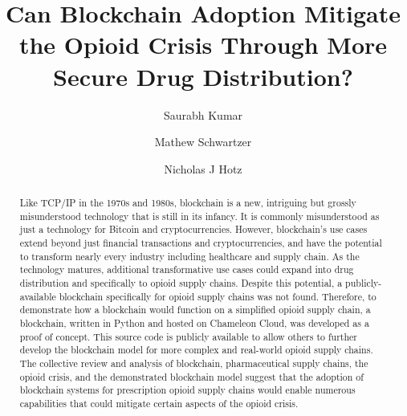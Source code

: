 \documentclass[sigconf]{acmart}
\begin{document}
\title{Can Blockchain Adoption Mitigate the Opioid Crisis Through More Secure Drug Distribution?}


\author{Saurabh Kumar}

\author{Mathew Schwartzer}

\author{Nicholas J Hotz}

\begin{abstract}
Like TCP/IP in the 1970s and 1980s, blockchain is a new, intriguing but grossly misunderstood technology that is still in its infancy. It is commonly misunderstood as just a technology for Bitcoin and cryptocurrencies. However, blockchain's use cases extend beyond just financial transactions and cryptocurrencies, and have the potential to transform nearly every industry including healthcare and supply chain. As the technology matures, additional transformative use cases could expand into drug distribution and specifically to opioid supply chains. Despite this potential, a publicly-available blockchain specifically for opioid supply chains was not found. Therefore, to demonstrate how a blockchain would function on a simplified opioid supply chain, a blockchain, written in Python and hosted on Chameleon Cloud, was developed as a proof of concept. This source code is publicly available to allow others to further develop the blockchain model for more complex and real-world opioid supply chains. The collective review and analysis of blockchain, pharmaceutical supply chains, the opioid crisis, and the demonstrated blockchain model suggest that the adoption of blockchain systems for prescription opioid supply chains would enable numerous capabilities that could mitigate certain aspects of the opioid crisis.
\end{abstract}


\maketitle
\end{document}
